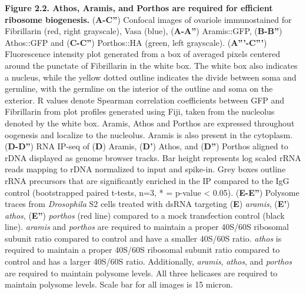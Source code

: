 \documentclass[12pt,twoside]{reedthesis}
\begin{document}
\textbf{Figure 2.2. Athos, Aramis, and Porthos are required for efficient
ribosome biogenesis.} (\textbf{A-C''}) Confocal images of ovariole
immunostained for Fibrillarin (red, right grayscale), Vasa (blue),
(\textbf{A-A''}) Aramis::GFP, (\textbf{B-B''}) Athos::GFP and (\textbf{C-C''})
Porthos::HA (green, left grayscale). (\textbf{A'''-C'''}) Fluorescence
intensity plot generated from a box of averaged pixels centered around
the punctate of Fibrillarin in the white box. The white box also
indicates a nucleus, while the yellow dotted outline indicates the
divide between soma and germline, with the germline on the interior of
the outline and soma on the exterior. R values denote Spearman
correlation coefficients between GFP and Fibrillarin from plot profiles
generated using Fiji, taken from the nucleolus denoted by the white box.
Aramis, Athos and Porthos are expressed throughout oogenesis and
localize to the nucleolus. Aramis is also present in the cytoplasm.
(\textbf{D-D''}) RNA IP-seq of (\textbf{D}) Aramis, (\textbf{D'}) Athos, and (\textbf{D''})
Porthos aligned to rDNA displayed as genome browser tracks. Bar height
represents log scaled rRNA reads mapping to rDNA normalized to input and
spike-in. Grey boxes outline rRNA precursors that are significantly
enriched in the IP compared to the IgG control (bootstrapped paired
t-tests, n=3, * = p-value \textless{} 0.05). (\textbf{E-E''}) Polysome traces from
\emph{Drosophila} S2 cells treated with dsRNA targeting (\textbf{E}) \emph{aramis},
(\textbf{E'}) \emph{athos}, (\textbf{E''}) \emph{porthos} (red line) compared to a mock
transfection control (black line). \emph{aramis} and \emph{porthos} are required
to maintain a proper 40S/60S ribosomal subunit ratio compared to control
and have a smaller 40S/60S ratio. \emph{athos} is required to maintain a
proper 40S/60S ribosomal subunit ratio compared to control and has a
larger 40S/60S ratio. Additionally, \emph{aramis}, \emph{athos}, and \emph{porthos} are
required to maintain polysome levels. All three helicases are required
to maintain polysome levels. Scale bar for all images is 15 micron.
\end{document}

